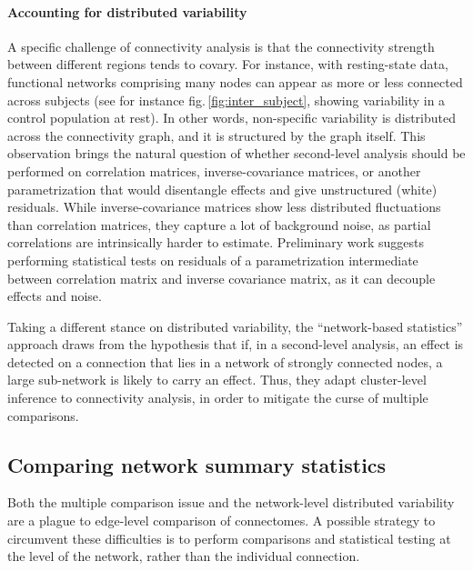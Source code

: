 \documentclass[5p]{elsarticle}
\begin{document}

\paragraph{Accounting for distributed variability}
%
A specific challenge of connectivity analysis is that the connectivity
strength between different regions tends to covary. For instance, with
resting-state data, functional networks comprising many nodes can appear
as more or less connected across subjects (see for instance
fig.\,\ref{fig:inter_subject}, showing variability in a control
population at rest). In other words, non-specific variability is
distributed across the connectivity graph, and it is structured by the
graph itself. This observation brings the natural question of whether
second-level analysis should be performed on correlation matrices,
inverse-covariance matrices, or another parametrization that would
disentangle effects and give unstructured (white) residuals. While
inverse-covariance matrices show less distributed fluctuations than
correlation matrices, they capture a lot of background noise, as partial
correlations are intrinsically harder to estimate. Preliminary work
\cite{varoquaux2010b} suggests performing statistical tests on residuals of
a parametrization intermediate between correlation matrix and inverse
covariance matrix, as it can decouple effects and noise.

Taking a different stance on distributed variability, the ``network-based
statistics'' approach \cite{zalesky2010} draws from the hypothesis that
if, in a second-level analysis, an effect is detected on a connection
that lies in a network of strongly connected nodes, a large
sub-network is
likely to carry an effect. Thus, they adapt cluster-level inference to
connectivity analysis, in order to mitigate the curse of multiple
comparisons.


\subsection{Comparing network summary statistics}

Both the multiple comparison issue and the network-level distributed
variability are a plague to edge-level comparison of connectomes. A
possible strategy to circumvent these difficulties is to perform
comparisons and statistical testing at the level of the network, rather
than the individual connection. 
\end{document}
